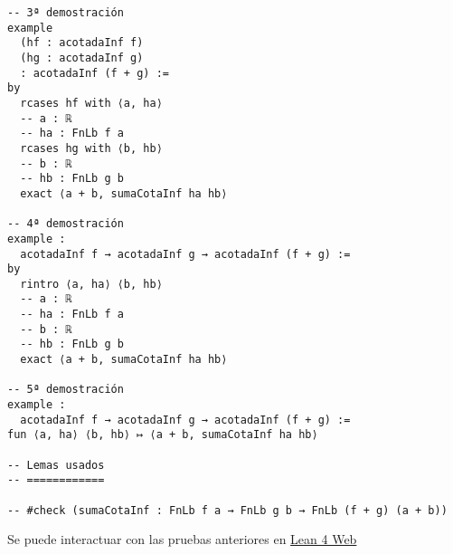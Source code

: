 \begin{verbatim}
-- 3ª demostración
example
  (hf : acotadaInf f)
  (hg : acotadaInf g)
  : acotadaInf (f + g) :=
by
  rcases hf with ⟨a, ha⟩
  -- a : ℝ
  -- ha : FnLb f a
  rcases hg with ⟨b, hb⟩
  -- b : ℝ
  -- hb : FnLb g b
  exact ⟨a + b, sumaCotaInf ha hb⟩

-- 4ª demostración
example :
  acotadaInf f → acotadaInf g → acotadaInf (f + g) :=
by
  rintro ⟨a, ha⟩ ⟨b, hb⟩
  -- a : ℝ
  -- ha : FnLb f a
  -- b : ℝ
  -- hb : FnLb g b
  exact ⟨a + b, sumaCotaInf ha hb⟩

-- 5ª demostración
example :
  acotadaInf f → acotadaInf g → acotadaInf (f + g) :=
fun ⟨a, ha⟩ ⟨b, hb⟩ ↦ ⟨a + b, sumaCotaInf ha hb⟩

-- Lemas usados
-- ============

-- #check (sumaCotaInf : FnLb f a → FnLb g b → FnLb (f + g) (a + b))
\end{verbatim}
Se puede interactuar con las pruebas anteriores en \href{https://lean.math.hhu.de/\#url=https://raw.githubusercontent.com/jaalonso/Calculemus2/main/src/Suma\_de\_funciones\_acotadas\_inferiormente.lean}{Lean 4 Web}

